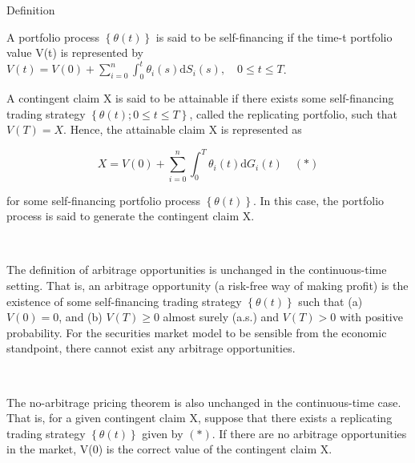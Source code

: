\documentclass[c, dvipsnames, 8pt]{beamer}
\begin{document}
\begin{frame}[shrink=5]

\frametitle{\insertsection} 
\framesubtitle{\insertsubsection} 


\begin{block}{Definition}
	
A portfolio process $\left \{ \theta (t) \right \}$ is said to be self-financing if the time-t portfolio value V(t) is represented by $V(t) = V(0) + \sum_{i=0}^{n}\int_{0}^{t}\theta _i(s)\mathrm{d}S_i(s),\quad 0\leqslant t\leqslant T$. 

\end{block}



A contingent claim X is said to be attainable if there exists some self-financing trading strategy $\left \{ \theta (t); 0\leqslant t\leqslant T \right \}$, called the replicating portfolio, such that $V(T) = X$. Hence, the attainable claim X is represented as 


$$X = V(0) + \sum_{i=0}^{n}\int_{0}^{T}\theta _i(t)\mathrm{d}G_i(t)\quad(\ast)$$


for some self-financing portfolio process $\left \{ \theta (t) \right \}$. In this case, the portfolio process is said to generate the contingent claim X.

\

The definition of arbitrage opportunities is unchanged in the continuous-time setting. That is, an arbitrage opportunity (a risk-free way of making profit) is the existence of some self-financing trading strategy $\left \{ \theta (t) \right \}$ such that (a) $V(0) = 0$, and (b) $V(T)\geqslant 0$ almost surely (a.s.) and $V(T)> 0$ with positive probability. For the securities market model to be sensible from the economic standpoint, there cannot exist any arbitrage opportunities.


\

The no-arbitrage pricing theorem is also unchanged in the continuous-time case. That is, for a given contingent claim X, suppose that there exists a replicating trading strategy $\left \{ \theta (t) \right \}$ given by $(\ast)$. If there are no arbitrage opportunities in the market, V(0) is the correct value of the contingent claim X.


\end{frame}

	
\end{document}
